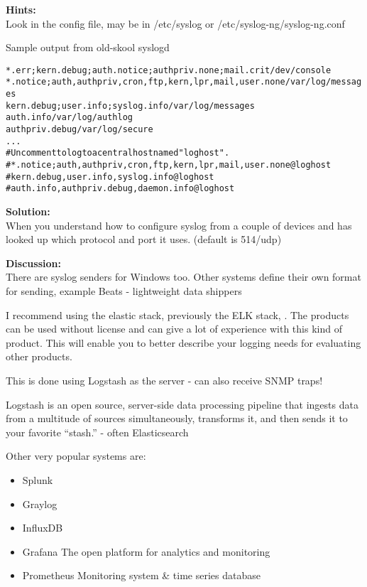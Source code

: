 \documentclass[a4paper,11pt,notitlepage]{report}
\begin{document}
{\bf Hints:}\\
Look in the config file, may be in /etc/syslog  or /etc/syslog-ng/syslog-ng.conf

Sample output from old-skool syslogd
\begin{alltt}
\small
*.err;kern.debug;auth.notice;authpriv.none;mail.crit    /dev/console
*.notice;auth,authpriv,cron,ftp,kern,lpr,mail,user.none /var/log/messages
kern.debug;user.info;syslog.info                        /var/log/messages
auth.info                                               /var/log/authlog
authpriv.debug                                          /var/log/secure
...
# Uncomment to log to a central host named "loghost".
#*.notice;auth,authpriv,cron,ftp,kern,lpr,mail,user.none        @loghost
#kern.debug,user.info,syslog.info                               @loghost
#auth.info,authpriv.debug,daemon.info                           @loghost
\end{alltt}

{\bf Solution:}\\
When you understand how to configure syslog from a couple of devices and has looked up which protocol and port it uses. (default is 514/udp)

{\bf Discussion:}\\
There are syslog senders for Windows too. Other systems define their own format for sending, example Beats - lightweight data shippers 

I recommend using the elastic stack, previously the ELK stack, . The products can be used without license and can give a lot of experience with this kind of product. This will enable you to better describe your logging needs for evaluating other products.

This is done using Logstash as the server - can also receive SNMP traps!

Logstash is an open source, server-side data processing pipeline that ingests data from a multitude of sources simultaneously, transforms it, and then sends it to your favorite “stash.” - often Elasticsearch

Other very popular systems are:

\begin{itemize}
\item Splunk 
\item Graylog 
\item InfluxDB 
\item Grafana The open platform for analytics and monitoring 
\item Prometheus Monitoring system \& time series database 
\end{itemize}
\end{document}
